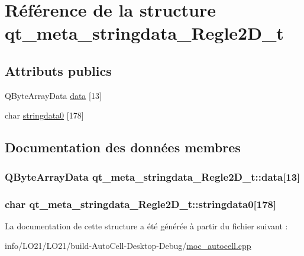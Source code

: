 \hypertarget{structqt__meta__stringdata___regle2_d__t}{}\section{Référence de la structure qt\+\_\+meta\+\_\+stringdata\+\_\+\+Regle2\+D\+\_\+t}
\label{structqt__meta__stringdata___regle2_d__t}
\subsection*{Attributs publics}
\begin{DoxyCompactItemize}
\item 
Q\+Byte\+Array\+Data \hyperlink{structqt__meta__stringdata___regle2_d__t_af5da57dd8257a53d5fa5ae25ba15d12c}{data} \mbox{[}13\mbox{]}
\item 
char \hyperlink{structqt__meta__stringdata___regle2_d__t_aa969665748e3c27f0a24557b6d8d3ec5}{stringdata0} \mbox{[}178\mbox{]}
\end{DoxyCompactItemize}


\subsection{Documentation des données membres}
\subsubsection[{\texorpdfstring{data}{data}}]{\setlength{\rightskip}{0pt plus 5cm}Q\+Byte\+Array\+Data qt\+\_\+meta\+\_\+stringdata\+\_\+\+Regle2\+D\+\_\+t\+::data\mbox{[}13\mbox{]}}\hypertarget{structqt__meta__stringdata___regle2_d__t_af5da57dd8257a53d5fa5ae25ba15d12c}{}\label{structqt__meta__stringdata___regle2_d__t_af5da57dd8257a53d5fa5ae25ba15d12c}
\subsubsection[{\texorpdfstring{stringdata0}{stringdata0}}]{\setlength{\rightskip}{0pt plus 5cm}char qt\+\_\+meta\+\_\+stringdata\+\_\+\+Regle2\+D\+\_\+t\+::stringdata0\mbox{[}178\mbox{]}}\hypertarget{structqt__meta__stringdata___regle2_d__t_aa969665748e3c27f0a24557b6d8d3ec5}{}\label{structqt__meta__stringdata___regle2_d__t_aa969665748e3c27f0a24557b6d8d3ec5}


La documentation de cette structure a été générée à partir du fichier suivant \+:\begin{DoxyCompactItemize}
\item 
info/\+L\+O21/\+L\+O21/build-\/\+Auto\+Cell-\/\+Desktop-\/\+Debug/\hyperlink{moc__autocell_8cpp}{moc\+\_\+autocell.\+cpp}\end{DoxyCompactItemize}
